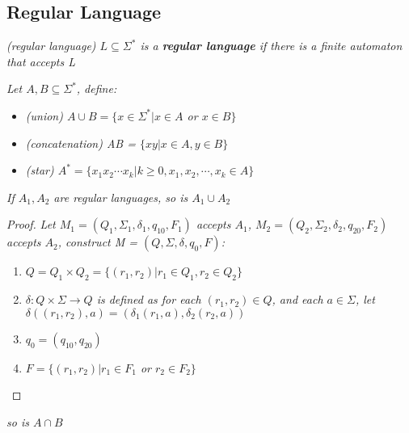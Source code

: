\documentclass{article}
\begin{document}
\subsection{Regular Language}
\begin{defn}
    \textit{(regular language) $L \subseteq \Sigma^*$ is a \textbf{regular language} if there is a finite automaton that accepts L}

    \textit{Let $A,B\subseteq\Sigma^*$, define:}

    \begin{itemize}
        \item \textit{(union) $A\cup B = \{x\in \Sigma^*|x\in A$ or $x\in B\}$}
        \item \textit{(concatenation) AB = $\{xy|x\in A,y\in B\}$}
        \item \textit{(star) $A^* = \{x_1x_2\cdots x_k| k\geq 0,x_1,x_2,\cdots,x_k\in A\}$}
    \end{itemize}
\end{defn}

\begin{thm}
    \textit{If $A_1,A_2$ are regular languages, so is $A_1\cup A_2$}

    \begin{proof}
        \textit{Let $M_1 = (Q_1,\Sigma_1,\delta_1,q_{10},F_1)$ accepts $A_1$, $M_2 = (Q_2,\Sigma_2,\delta_2,q_{20},F_2)$ accepts $A_2$, construct M = $(Q,\Sigma,\delta,q_0,F)$:}
        \begin{enumerate}
            \item $Q = Q_1\times Q_2 = \{(r_1,r_2)|r_1\in Q_1,r_2\in Q_2\}$
            \item \textit{$\delta:Q\times \Sigma \rightarrow Q$ is defined as for each $(r_1,r_2)\in Q$, and each $a \in \Sigma$, let $\delta ((r_1,r_2),a) = (\delta_1(r_1,a),\delta_2(r_2,a))$}
            \item $q_0 = (q_{10},q_{20})$
            \item \textit{$F = \{(r_1,r_2)|r_1\in F_1$ or $r_2\in F_2\}$}
        \end{enumerate}
    \end{proof}
    \begin{remark}
        \textit{so is $A\cap B$}
    \end{remark}
\end{thm}
\end{document}
